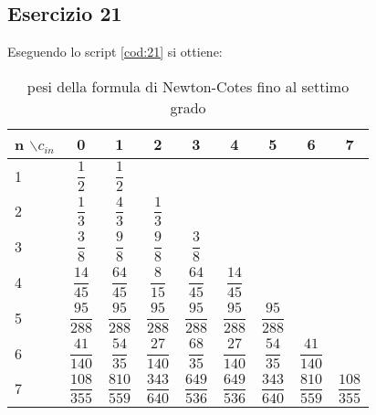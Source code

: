 \subsection{Esercizio 21}

Eseguendo lo script \ref{cod:21} si ottiene:
\begin{table}[h]
    \centering
    \renewcommand\arraystretch{3}
    \begin{tabular}{|l|c|c|c|c|c|c|c|c|}
        \hline
        n $\backslash c_{in}$ & 0 & 1 & 2 & 3 & 4 & 5 & 6 & 7 \\
        \hline
        1 & $\dfrac{1}{2}$ & $\dfrac{1}{2}$ & & & & &  &\\
        \hline
        2 & $\dfrac{1}{3}$ & $\dfrac{4}{3}$ & $\dfrac{1}{3}$ & & & &&\\
        \hline
        3 &  $\dfrac{3}{8}$ & $\dfrac{9}{8}$ & $\dfrac{9}{8}$ & $\dfrac{3}{8}$ & & & & \\
        \hline
        4 & $\dfrac{14}{45} $ & $\dfrac{64}{45} $ & $\dfrac{8}{15} $ & $\dfrac{64}{45} $ &$\dfrac{14}{45} $ &&&\\
        \hline
        5 & $\dfrac{95}{288}$ & $\dfrac{95}{288}$ & $\dfrac{95}{288}$ & $\dfrac{95}{288}$ & $\dfrac{95}{288}$ & $\dfrac{95}{288}$ &&\\
        \hline
        6 & $\dfrac{41}{140}$ & $\dfrac{54}{35}$ & $\dfrac{27}{140}$ & $\dfrac{68}{35}$ & $\dfrac{27}{140}$ & $\dfrac{54}{35}$ & $\dfrac{41}{140}$ &\\
        \hline
        7 & $\dfrac{108}{355}$ & $\dfrac{810}{559}$ & $\dfrac{343}{640}$ & $\dfrac{649}{536}$ & $\dfrac{649}{536}$  & $\dfrac{343}{640}$ & $\dfrac{810}{559}$ & $\dfrac{108}{355}$\\
        \hline
    \end{tabular}
    \caption{pesi della formula di Newton-Cotes fino al settimo grado}
\end{table}